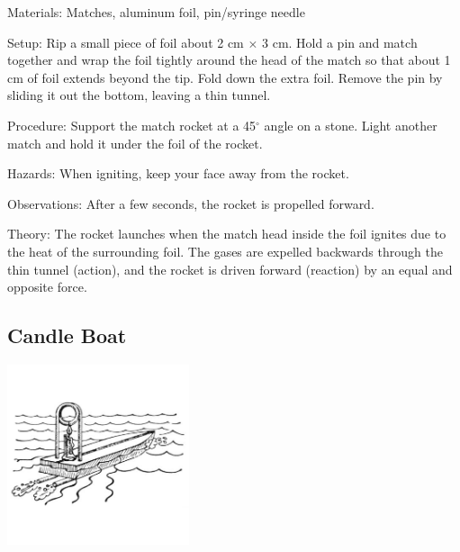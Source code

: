 \begin{multicols}{2}
\begin{description*}
\item[Materials:]{Matches, aluminum foil, pin/syringe needle}
\item[Setup:]{Rip a small piece of foil about 2 cm $\times$ 3 cm. Hold a pin and match together and wrap the foil tightly around the head of the match so that about 1 cm of foil extends beyond the tip. Fold down the extra foil. Remove the pin by sliding it out the bottom, leaving a thin tunnel. }
\item[Procedure:]{Support the match rocket at a 45$^\circ$ angle on a stone. Light another match and hold it under the foil of the rocket.}
\item[Hazards:]{When igniting, keep your face away from the rocket.}
\item[Observations:]{After a few seconds, the rocket is propelled forward.}
\item[Theory:]{The rocket launches when the match head inside the foil ignites due to the heat of the surrounding foil. The gases are expelled backwards through the thin tunnel (action), and the rocket is driven forward (reaction) by an equal and opposite force.}
\end{description*}

\vfill
\columnbreak

\subsection{Candle Boat}

\begin{center}
\includegraphics[width=0.4\textwidth]{./img/candle-boat.jpg}
\end{center}


\end{multicols}
